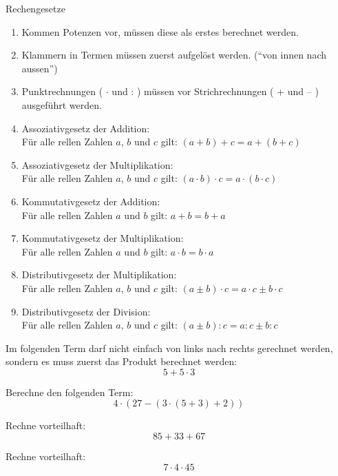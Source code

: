 \begin{law}{Rechengesetze}
	\begin{enumerate}
        \item
			Kommen Potenzen vor, müssen diese als erstes berechnet werden.
		\item
			Klammern in Termen müssen zuerst aufgelöst werden. ("`von innen nach aussen"')
        \item
			Punktrechnungen ( $\cdot$ und : ) müssen vor Strichrechnungen ( + und -- ) ausgeführt werden.
		\item
			Assoziativgesetz der Addition:\\
			Für alle rellen Zahlen $a$, $b$ und $c$ gilt: $(a+b)+c = a+(b+c)$
		\item
			Assoziativgesetz der Multiplikation:\\
			Für alle rellen Zahlen $a$, $b$ und $c$ gilt: $(a\cdot b)\cdot c = a\cdot (b\cdot c)$
		\item
			Kommutativgesetz der Addition:\\
			Für alle rellen Zahlen $a$ und $b$ gilt: $a+ b= b+ a$
		\item
			Kommutativgesetz der Multiplikation:\\
			Für alle rellen Zahlen $a$ und $b$ gilt: $a\cdot b= b\cdot a$
		\item
			Distributivgesetz der Multiplikation:\\
			Für alle rellen Zahlen $a$, $b$ und $c$ gilt: $(a\pm b)\cdot c = a\cdot c \pm b\cdot c$
		\item
			Distributivgesetz der Division:\\
			Für alle rellen Zahlen $a$, $b$ und $c$ gilt: $(a\pm b): c = a: c \pm b: c$	
	\end{enumerate}
\end{law}

\begin{example}
Im folgenden Term darf nicht einfach von links nach rechts gerechnet werden, sondern es muss zuerst das Produkt berechnet werden:
\[
	5+5\cdot 3
\]
\end{example}

\begin{example}
Berechne den folgenden Term:
\[
	4\cdot(27-(3\cdot (5+3)+2))
\]
\end{example}

\begin{example}
Rechne vorteilhaft:
\[
	85+33+67
\]
\end{example}

\begin{example}
Rechne vorteilhaft:
\[
	7\cdot 4 \cdot 45
\]
\end{example}

